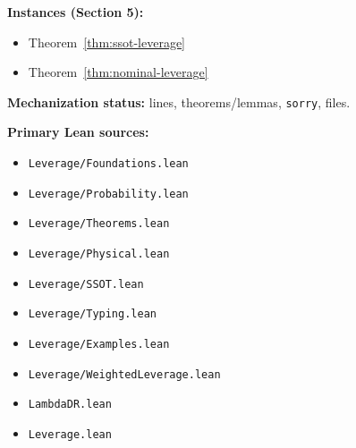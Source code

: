 \textbf{Instances (Section 5):}
\begin{itemize}
\item Theorem~\ref{thm:ssot-leverage}
\item Theorem~\ref{thm:nominal-leverage}
\end{itemize}

\textbf{Mechanization status:} \LeanTotalLines{} lines, \LeanTotalTheorems{} theorems/lemmas, \LeanTotalSorry{} \texttt{sorry}, \LeanTotalFiles{} files.

\textbf{Primary Lean sources:}
\begin{itemize}
\item \texttt{Leverage/Foundations.lean}
\item \texttt{Leverage/Probability.lean}
\item \texttt{Leverage/Theorems.lean}
\item \texttt{Leverage/Physical.lean}
\item \texttt{Leverage/SSOT.lean}
\item \texttt{Leverage/Typing.lean}
\item \texttt{Leverage/Examples.lean}
\item \texttt{Leverage/WeightedLeverage.lean}
\item \texttt{LambdaDR.lean}
\item \texttt{Leverage.lean}
\end{itemize}
